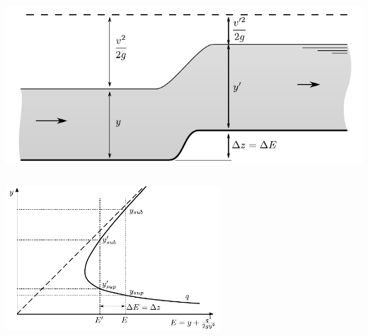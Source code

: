 \documentclass[t]{beamer}
\begin{document}
\begin{frame}
{\begin{columns}[t,onlytextwidth]
					\includegraphics[width=\textwidth]{fig/kanaalstroming/Open_kanaal_bodemstijging_superkritisch}
			\end{columns}
			
			\center
            \includegraphics[width=0.6\textwidth]{fig/kanaalstroming/Specifieke_energie_diagram_bodemstijging}
		}
  	\end{frame}
\end{document}
